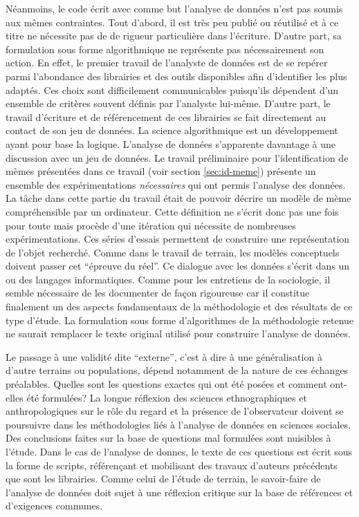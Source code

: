 Néanmoins, le code écrit avec comme but l'analyse de données n'est pas soumis aux mêmes contraintes. Tout d'abord, il est très peu publié ou réutilisé et à ce titre ne nécessite pas de de rigueur particulière dans l'écriture. D'autre part, sa formulation sous forme algorithmique ne représente pas nécessairement son action. En effet, le premier travail de l'analyste de données est de se repérer parmi l'abondance des librairies et des outils disponibles afin d'identifier les plus adaptés. Ces choix sont difficilement communicables puisqu'ils dépendent d'un ensemble de critères souvent définis par l'analyste lui-même. D'autre part, le travail d'écriture et de référencement de ces librairies se fait directement au contact de son jeu de données. La science algorithmique est un développement ayant pour base la logique. L'analyse de données s'apparente davantage à une discussion avec un jeu de données. Le travail préliminaire pour l'identification de mèmes présentées dans ce travail (voir section \ref{sec:id-meme}) présente un ensemble des expérimentations \textit{nécessaires} qui ont permis l'analyse des données. La tâche dans cette partie du travail était de pouvoir décrire un modèle de mème compréhensible par un ordinateur. Cette définition ne s'écrit donc pas une fois pour toute mais procède d'une itération qui nécessite de nombreuses expérimentations. Ces séries d'essais permettent de construire une représentation de l'objet recherché. Comme dans le travail de terrain, les modèles conceptuels doivent passer cet ``épreuve du réel''. Ce dialogue avec les données s'écrit dans un ou des langages informatiques. Comme pour les entretiens de la sociologie, il semble nécessaire de les documenter de façon rigoureuse car il constitue finalement un des aspects fondamentaux de la méthodologie et des résultats de ce type d'étude. La formulation sous forme d'algorithmes de la méthodologie retenue ne saurait remplacer le texte original utilisé pour construire l'analyse de données. 

Le passage à une validité dite ``externe'', c'est à dire à une généralisation à d'autre terrains ou populations, dépend notamment de la nature de ces échanges préalables. Quelles sont les questions exactes qui ont été posées et comment ont-elles été formulées? La longue réflexion des sciences ethnographiques et anthropologiques sur le rôle du regard et la présence de l'observateur doivent se poursuivre dans les méthodologies liés à l'analyse de données en sciences sociales. Des conclusions faites sur la base de questions mal formulées sont nuisibles à l'étude. Dans le cas de l'analyse de donnes, le texte de ces questions est écrit sous la forme de scripts, référençant et mobilisant des travaux d'auteurs précédents que sont les librairies. Comme celui de l'étude de terrain, le savoir-faire de l'analyse de données doit sujet à une réflexion critique sur la base de références et d'exigences communes.

